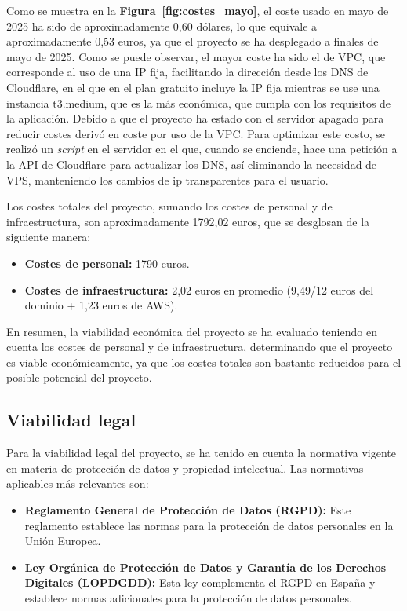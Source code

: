 Como se muestra en la \textbf{Figura~\ref{fig:costes_mayo}}, el coste usado en mayo de 2025 ha sido de aproximadamente 0,60 dólares, lo que equivale a aproximadamente 0,53 euros, ya que el proyecto se ha desplegado a finales de mayo de 2025. Como se puede observar, el mayor coste ha sido el de VPC, que corresponde al uso de una IP fija, facilitando la dirección desde los DNS de Cloudflare, en el que en el plan gratuito incluye la IP fija mientras se use una instancia t3.medium, que es la más económica, que cumpla con los requisitos de la aplicación. Debido a que el proyecto ha estado con el servidor apagado para reducir costes derivó en coste por uso de la VPC. Para optimizar este costo, se realizó un \textit{script} en el servidor en el que, cuando se enciende, hace una petición a la API de Cloudflare para actualizar los DNS, así eliminando la necesidad de VPS, manteniendo los cambios de ip transparentes para el usuario.


Los costes totales del proyecto, sumando los costes de personal y de infraestructura, son aproximadamente 1792,02 euros, que se desglosan de la siguiente manera:
\begin{itemize}
    \item \textbf{Costes de personal:} 1790 euros.
    \item \textbf{Costes de infraestructura:} 2,02 euros en promedio (9,49/12 euros del dominio + 1,23 euros de AWS).
\end{itemize}


En resumen, la viabilidad económica del proyecto se ha evaluado teniendo en cuenta los costes de personal y de infraestructura, determinando que el proyecto es viable económicamente, ya que los costes totales son bastante reducidos para el posible potencial del proyecto.

\subsection{Viabilidad legal}
Para la viabilidad legal del proyecto, se ha tenido en cuenta la normativa vigente en materia de protección de datos y propiedad intelectual.
Las normativas aplicables más relevantes son:
\begin{itemize}
    \item \textbf{Reglamento General de Protección de Datos (RGPD):} Este reglamento establece las normas para la protección de datos personales en la Unión Europea.~\cite{RGPD}
    \item \textbf{Ley Orgánica de Protección de Datos y Garantía de los Derechos Digitales (LOPDGDD):} Esta ley complementa el RGPD en España y establece normas adicionales para la protección de datos personales.~\cite{LOPDGDD}	
\end{itemize}

